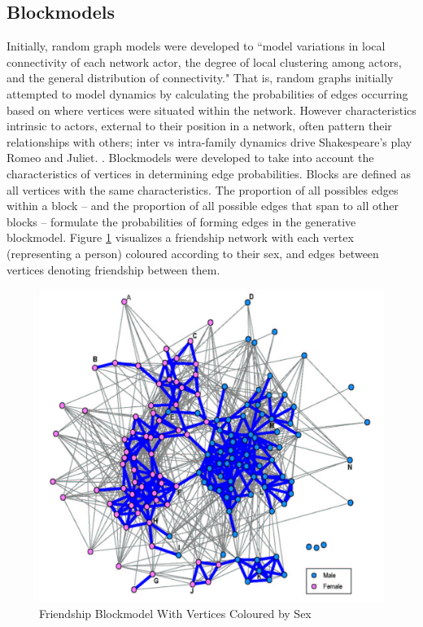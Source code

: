 \subsection{Blockmodels}\label{sec:SBM}

Initially, random graph models were developed to ``model  variations in local
connectivity of each network actor, the degree of local clustering among actors,
and the general distribution of connectivity." \cite{robins2013tutorial} That
is, random graphs initially attempted to model dynamics by calculating the
probabilities of edges occurring based on where vertices were situated within
the network. However characteristics intrinsic to actors, external to their
position in a network, often pattern their relationships with others; inter vs
intra-family dynamics drive Shakespeare's play Romeo and Juliet.
\cite{doreian2005generalized}. Blockmodels were developed to take into account
the characteristics of vertices in determining edge probabilities. Blocks are
defined as all vertices with the same characteristics. The proportion of all
possibles edges within a block -- and the proportion of all possible edges that
span to all other blocks -- formulate the probabilities of forming edges in the
generative blockmodel. Figure \ref{fig:blockmodel_ex} visualizes a friendship
network with each vertex (representing a person) coloured according to their
sex, and edges between vertices denoting friendship between them.

\begin{singlespacing}
    \begin{figure}[H]
    \centering
    \includegraphics[scale=0.2]{Figures/blockmodel_ex}
    \caption[Friendship Blockmodel With Vertices Coloured by Sex]{Friendship Blockmodel With Vertices Coloured by Sex}
    \label{fig:blockmodel_ex}
    \end{figure}
\end{singlespacing}

